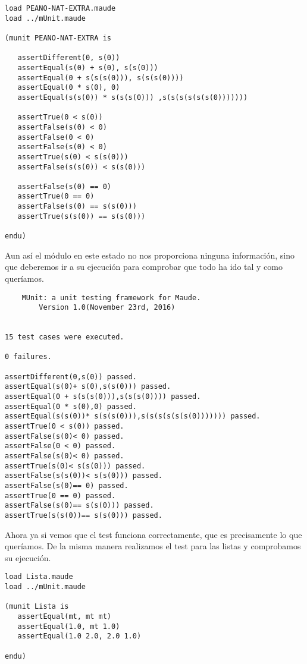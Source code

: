 \documentclass[12pt,a4paper]{book}
\begin{document}
\begin{verbatim}
load PEANO-NAT-EXTRA.maude
load ../mUnit.maude

(munit PEANO-NAT-EXTRA is

   assertDifferent(0, s(0))
   assertEqual(s(0) + s(0), s(s(0)))
   assertEqual(0 + s(s(s(0))), s(s(s(0))))
   assertEqual(0 * s(0), 0)
   assertEqual(s(s(0)) * s(s(s(0))) ,s(s(s(s(s(s(0)))))))

   assertTrue(0 < s(0))
   assertFalse(s(0) < 0)
   assertFalse(0 < 0)
   assertFalse(s(0) < 0)
   assertTrue(s(0) < s(s(0)))
   assertFalse(s(s(0)) < s(s(0)))
   
   assertFalse(s(0) == 0)
   assertTrue(0 == 0)
   assertFalse(s(0) == s(s(0)))
   assertTrue(s(s(0)) == s(s(0)))
   
endu)
\end{verbatim}

Aun as\' i el m\'odulo en este estado no nos proporciona ninguna informaci\'on, sino que deberemos ir a su ejecuci\'on para comprobar que todo ha ido tal y como quer\'iamos. \par

\begin{verbatim}
	MUnit: a unit testing framework for Maude.
		Version 1.0(November 23rd, 2016)


15 test cases were executed.

0 failures.

assertDifferent(0,s(0)) passed.
assertEqual(s(0)+ s(0),s(s(0))) passed.
assertEqual(0 + s(s(s(0))),s(s(s(0)))) passed.
assertEqual(0 * s(0),0) passed.
assertEqual(s(s(0))* s(s(s(0))),s(s(s(s(s(s(0))))))) passed.
assertTrue(0 < s(0)) passed.
assertFalse(s(0)< 0) passed.
assertFalse(0 < 0) passed.
assertFalse(s(0)< 0) passed.
assertTrue(s(0)< s(s(0))) passed.
assertFalse(s(s(0))< s(s(0))) passed.
assertFalse(s(0)== 0) passed.
assertTrue(0 == 0) passed.
assertFalse(s(0)== s(s(0))) passed.
assertTrue(s(s(0))== s(s(0))) passed.
\end{verbatim}

Ahora ya si vemos que el test funciona correctamente, que es precisamente lo que quer\'iamos. De la misma manera realizamos el test para las listas y comprobamos su ejecuci\'on. \par

\begin{verbatim}
load Lista.maude
load ../mUnit.maude

(munit Lista is
   assertEqual(mt, mt mt)
   assertEqual(1.0, mt 1.0)
   assertEqual(1.0 2.0, 2.0 1.0)

endu)

\end{verbatim}
\end{document}
